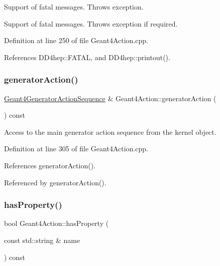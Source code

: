 Support of fatal messages. Throws exception. 

Support of fatal messages. Throws exception if required. 

Definition at line 250 of file Geant4\+Action.\+cpp.



References D\+D4hep\+::\+F\+A\+T\+AL, and D\+D4hep\+::printout().

\hypertarget{class_d_d4hep_1_1_simulation_1_1_geant4_action_a401a8dceb3d540c069fc24f66d41bf64}{}\label{class_d_d4hep_1_1_simulation_1_1_geant4_action_a401a8dceb3d540c069fc24f66d41bf64} 
\subsubsection{\texorpdfstring{generator\+Action()}{generatorAction()}}
{\footnotesize\ttfamily \hyperlink{class_d_d4hep_1_1_simulation_1_1_geant4_generator_action_sequence}{Geant4\+Generator\+Action\+Sequence} \& Geant4\+Action\+::generator\+Action (\begin{DoxyParamCaption}{ }\end{DoxyParamCaption}) const}



Access to the main generator action sequence from the kernel object. 



Definition at line 305 of file Geant4\+Action.\+cpp.



References generator\+Action().



Referenced by generator\+Action().

\hypertarget{class_d_d4hep_1_1_simulation_1_1_geant4_action_ad2ba790e944389191e28f1e618da33b1}{}\label{class_d_d4hep_1_1_simulation_1_1_geant4_action_ad2ba790e944389191e28f1e618da33b1} 
\subsubsection{\texorpdfstring{has\+Property()}{hasProperty()}}
{\footnotesize\ttfamily bool Geant4\+Action\+::has\+Property (\begin{DoxyParamCaption}\item[{const std\+::string \&}]{name }\end{DoxyParamCaption}) const}



